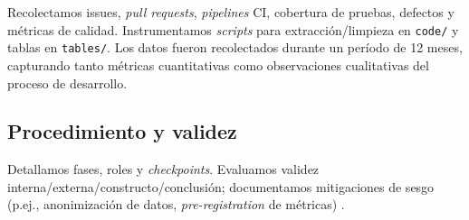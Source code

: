 Recolectamos issues, \textit{pull requests}, \textit{pipelines} CI, cobertura de pruebas, defectos y métricas de calidad. Instrumentamos \textit{scripts} para extracción/limpieza en \texttt{code/} y tablas en \texttt{tables/}. Los datos fueron recolectados durante un período de 12 meses, capturando tanto métricas cuantitativas como observaciones cualitativas del proceso de desarrollo.

\subsection{Procedimiento y validez}

Detallamos fases, roles y \textit{checkpoints}. Evaluamos validez interna/externa/constructo/conclusión; documentamos mitigaciones de sesgo (p.ej., anonimización de datos, \textit{pre-registration} de métricas) \cite{fitzpatrick2017risks}.